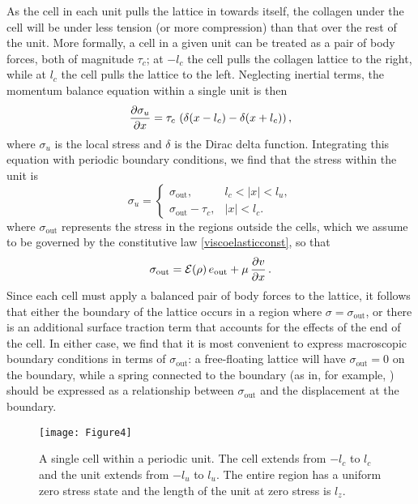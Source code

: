 As the cell in each unit pulls the lattice in towards itself, the collagen under the cell will be under less tension (or more compression) than that over the rest of the unit. More formally, a cell in a given unit can be treated as a pair of body forces, both of magnitude $\tau_c$; at $-l_c$ the cell pulls the collagen lattice to the right, while at $l_c$ the cell pulls the lattice to the left. Neglecting inertial terms, the momentum balance equation within a single unit is then
\[
 \frac{\partial \sigma_u}{\partial x} = \tau_c \, \left(\delta(x - l_c) - \delta(x+ l_c)\right),
\]
where $\sigma_u$ is the local stress and $\delta$ is the Dirac delta function. Integrating this equation with periodic boundary conditions, we find that the stress within the unit is
\begin{equation*}
 \sigma_u = \begin{cases}
             \sigma_\text{out}, & l_c < |x| < l_u, \\[6pt]
             \sigma_\text{out} - \tau_c, & |x| < l_c.
            \end{cases}
\end{equation*}
where $\sigma_\text{out}$ represents the stress in the regions outside the cells, which we assume to be governed by the constitutive law \eqref{viscoelasticconst}, so that
\begin{equation}
 \sigma_\text{out} = \mathcal{E}(\rho) \, e_\text{out} + \mu\,\frac{\partial v}{\partial x}\,. \label{viscoelastoutside}
\end{equation}
Since each cell must apply a balanced pair of body forces to the lattice, it follows that either the boundary of the lattice occurs in a region where $\sigma = \sigma_\text{out}$, or there is an additional surface traction term that accounts for the effects of the end of the cell. In either case, we find that it is most convenient to express macroscopic boundary conditions in terms of $\sigma_\text{out}$: a free-floating lattice will have $\sigma_\text{out} = 0$ on the boundary, while a spring connected to the boundary (as in, for example, \citet{Marenzana2006}) should be expressed as a relationship between $\sigma_\text{out}$ and the displacement at the boundary.


\begin{figure}[t]
\centering
{\texttt{[image: Figure4]}}
\caption{A single cell within a periodic unit. The cell extends from $-l_c$ to $l_c$ and the unit extends from $-l_u$ to $l_u$. The entire region has a uniform zero stress state and the length of the unit at zero stress is $l_z$.
}
\label{F:CellDiagram}
\end{figure}

